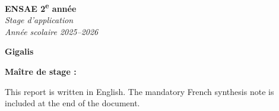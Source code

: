 \thispagestyle{empty}
\begin{center}
\vspace*{0.2cm}

\noindent
\begin{minipage}[t]{0.48\textwidth}
\raggedright
\large \studentName
\end{minipage}
\hfill
\begin{minipage}[t]{0.48\textwidth}
\raggedleft
\large \textbf{ENSAE 2\textsuperscript{e} année}\\[2pt]
\normalsize \emph{Stage d'application}\\
\normalsize \emph{Année scolaire 2025--2026}
\end{minipage}

\vspace{3.2cm}


\vfill

\noindent
\begin{minipage}[b]{0.48\textwidth}
\raggedright
\textbf{Gigalis}\\
\hostCity
\end{minipage}
\hfill
\begin{minipage}[b]{0.48\textwidth}
\raggedleft
\textbf{Maître de stage :} \supervisorName\\
\internshipDates
\end{minipage}

\vspace{1.2cm}
{\footnotesize This report is written in English. The mandatory French synthesis note is included at the end of the document.\par}
\vspace{0.4cm}
\end{center}
\clearpage

